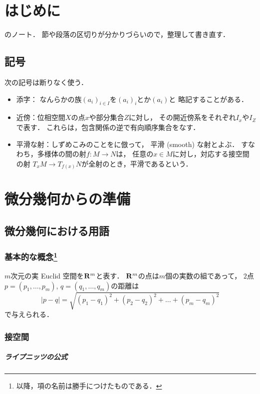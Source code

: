 \chapter*{はじめに}
\cite{OK77}のノート．
節や段落の区切りが分かりづらいので，整理して書き直す．

\section*{記号}
次の記号は断りなく使う．
\begin{itemize}
    \item 添字：
    なんらかの族$(a_i)_{i\in I}$を$(a_i)_i$とか$(a_i)$と
    略記することがある．
    \item 近傍：位相空間\(X\)の点\(x\)や部分集合\(Z\)に対し，
    その開近傍系をそれぞれ\(I_x\)や\(I_Z\)で表す．
    これらは，包含関係の逆で有向順序集合をなす．
    \item 平滑な射：しずめこみのことを\cite{KS90,Kas03}に倣って，
    平滑 (smooth) な射とよぶ．
    すなわち，多様体の間の射\(f\colon M\to N\)は，
    任意の\(x\in M\)に対し，対応する接空間の射
    \(T_{x}M\to T_{f(x)}N\)が全射のとき，平滑であるという．
\end{itemize}
\tableofcontents


\chapter{微分幾何からの準備}
\section{微分幾何における用語}
\subsection*{基本的な概念\footnote{以降，項の名前は勝手につけたものである．}}
\(m\)次元の実 Euclid 空間を\(\mathbf{R}^m\)と表す．
\(\mathbf{R}^m\)の点は\(m\)個の実数の組であって，
\(2\)点\(p=(p_1,\dots,p_m)\), \(q=(q_1,\dots,q_m)\)の距離は
\[
    \lvert p-q\rvert=\sqrt{
        (p_1-q_1)^2+(p_2-q_2)^2+\dots+(p_m-q_m)^2
    }
\]で与えられる．

\subsection*{接空間}
\paragraph{ライプニッツの公式}
